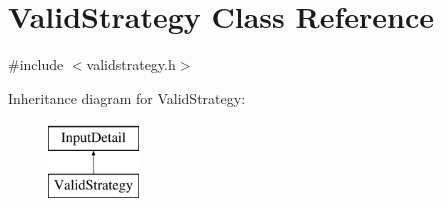 \hypertarget{classValidStrategy}{\section{Valid\-Strategy Class Reference}
\label{classValidStrategy}
}


{\ttfamily \#include $<$validstrategy.\-h$>$}

Inheritance diagram for Valid\-Strategy\-:\begin{figure}[H]
\begin{center}
\leavevmode
\includegraphics[height=2.000000cm]{classValidStrategy}
\end{center}
\end{figure}
